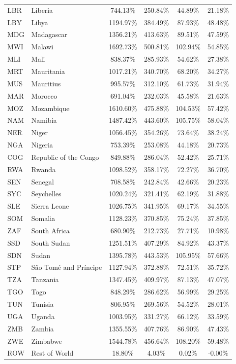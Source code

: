 \begin{center}
\begin{longtable}{llcccc}
  LBR & Liberia & 744.13\% & 250.84\% & 44.89\% & 21.18\% \\ 
  LBY & Libya & 1194.97\% & 384.49\% & 87.93\% & 48.48\% \\ 
  MDG & Madagascar & 1356.21\% & 413.63\% & 89.51\% & 47.59\% \\ 
  MWI & Malawi & 1692.73\% & 500.81\% & 102.94\% & 54.85\% \\ 
  MLI & Mali & 838.37\% & 285.93\% & 54.62\% & 27.38\% \\ 
  MRT & Mauritania & 1017.21\% & 340.70\% & 68.20\% & 34.27\% \\ 
  MUS & Mauritius & 995.57\% & 312.10\% & 61.73\% & 31.94\% \\ 
  MAR & Morocco & 691.04\% & 232.03\% & 45.58\% & 21.63\% \\ 
  MOZ & Mozambique & 1610.60\% & 475.88\% & 104.53\% & 57.42\% \\ 
  NAM & Namibia & 1487.42\% & 443.60\% & 105.75\% & 58.04\% \\ 
  NER & Niger & 1056.45\% & 354.26\% & 73.64\% & 38.24\% \\ 
  NGA & Nigeria & 753.39\% & 253.08\% & 44.18\% & 20.73\% \\ 
  COG & Republic of the Congo & 849.88\% & 286.04\% & 52.42\% & 25.71\% \\ 
  RWA & Rwanda & 1098.52\% & 358.17\% & 72.27\% & 36.70\% \\ 
  SEN & Senegal & 708.58\% & 242.84\% & 42.66\% & 20.23\% \\ 
  SYC & Seychelles & 1020.24\% & 321.41\% & 62.19\% & 31.88\% \\ 
  SLE & Sierra Leone & 1026.75\% & 341.95\% & 69.17\% & 34.55\% \\ 
  SOM & Somalia & 1128.23\% & 370.85\% & 75.24\% & 37.85\% \\ 
  ZAF & South Africa & 680.90\% & 212.73\% & 27.71\% & 10.98\% \\ 
  SSD & South Sudan & 1251.51\% & 407.29\% & 84.92\% & 43.37\% \\ 
  SDN & Sudan & 1395.78\% & 443.53\% & 105.95\% & 57.66\% \\ 
  STP & São Tomé and Príncipe & 1127.94\% & 372.88\% & 72.51\% & 35.72\% \\ 
  TZA & Tanzania & 1347.45\% & 409.97\% & 87.13\% & 47.07\% \\ 
  TGO & Togo & 848.29\% & 286.62\% & 56.99\% & 29.25\% \\ 
  TUN & Tunisia & 806.95\% & 269.56\% & 54.52\% & 28.01\% \\ 
  UGA & Uganda & 1003.95\% & 331.27\% & 66.12\% & 33.59\% \\ 
  ZMB & Zambia & 1355.55\% & 407.76\% & 86.90\% & 47.43\% \\ 
  ZWE & Zimbabwe & 1544.78\% & 456.64\% & 108.20\% & 59.48\% \\ 
  ROW & Rest of World & 18.80\% & 4.03\% & 0.02\% & -0.00\% \\ 


  \end{longtable}
	\endgroup
\end{center}

